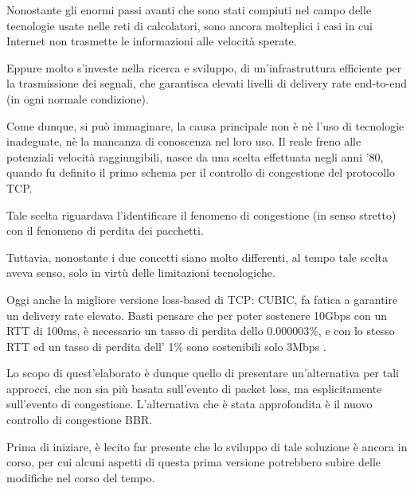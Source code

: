 
Nonostante gli enormi passi avanti che sono stati compiuti nel campo delle tecnologie usate nelle reti di calcolatori, sono ancora molteplici i casi in cui Internet non trasmette le informazioni alle velocità sperate. \bigskip

Eppure molto s’investe nella ricerca e sviluppo, di un’infrastruttura efficiente per la trasmissione dei segnali, che garantisca elevati livelli di delivery rate end-to-end (in ogni normale condizione). \bigskip

Come dunque, si può immaginare, la causa principale non è nè l’uso di tecnologie inadeguate, nè la mancanza di conoscenza nel loro uso. Il reale freno alle potenziali velocità raggiungibili, nasce da una scelta effettuata negli anni '80, quando fu definito il primo schema per il controllo di congestione del protocollo TCP. \bigskip

Tale scelta riguardava l’identificare il fenomeno di congestione (in senso stretto) con il fenomeno di perdita dei pacchetti. \bigskip

Tuttavia, nonostante i due concetti siano molto differenti, al tempo tale scelta aveva senso, solo in virtù delle limitazioni tecnologiche. \bigskip

Oggi anche la migliore versione loss-based di TCP: CUBIC, fa fatica a garantire un delivery rate elevato. Basti pensare che per poter sostenere 10Gbps con un RTT di 100ms, è necessario un tasso di perdita dello 0.000003\%, e con lo stesso RTT ed un tasso di perdita dell’ 1\% sono sostenibili solo 3Mbps \cite[p.~12]{ietf:draft-ietf-tcpm-cubic-05}. \bigskip

Lo scopo di quest'elaborato è dunque quello di presentare un'alternativa per tali approcci, che non sia più basata sull'evento di packet loss, ma esplicitamente sull'evento di congestione. L'alternativa che è stata approfondita è il nuovo controllo di congestione BBR. \bigskip

Prima di iniziare, è lecito far presente che lo sviluppo di tale soluzione è ancora in corso, per cui alcuni aspetti di questa prima versione potrebbero subire delle modifiche nel corso del tempo.